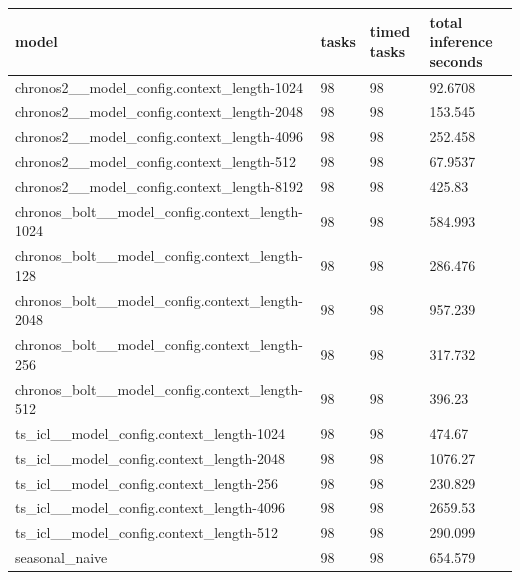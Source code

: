 \begin{tabular}{llll}
\toprule
model & tasks & timed tasks & total inference seconds \\
\midrule
chronos2\_\_model\_config.context\_length-1024 & 98 & 98 & 92.6708 \\
chronos2\_\_model\_config.context\_length-2048 & 98 & 98 & 153.545 \\
chronos2\_\_model\_config.context\_length-4096 & 98 & 98 & 252.458 \\
chronos2\_\_model\_config.context\_length-512 & 98 & 98 & 67.9537 \\
chronos2\_\_model\_config.context\_length-8192 & 98 & 98 & 425.83 \\
chronos\_bolt\_\_model\_config.context\_length-1024 & 98 & 98 & 584.993 \\
chronos\_bolt\_\_model\_config.context\_length-128 & 98 & 98 & 286.476 \\
chronos\_bolt\_\_model\_config.context\_length-2048 & 98 & 98 & 957.239 \\
chronos\_bolt\_\_model\_config.context\_length-256 & 98 & 98 & 317.732 \\
chronos\_bolt\_\_model\_config.context\_length-512 & 98 & 98 & 396.23 \\
ts\_icl\_\_model\_config.context\_length-1024 & 98 & 98 & 474.67 \\
ts\_icl\_\_model\_config.context\_length-2048 & 98 & 98 & 1076.27 \\
ts\_icl\_\_model\_config.context\_length-256 & 98 & 98 & 230.829 \\
ts\_icl\_\_model\_config.context\_length-4096 & 98 & 98 & 2659.53 \\
ts\_icl\_\_model\_config.context\_length-512 & 98 & 98 & 290.099 \\
seasonal\_naive & 98 & 98 & 654.579 \\
\bottomrule
\end{tabular}
